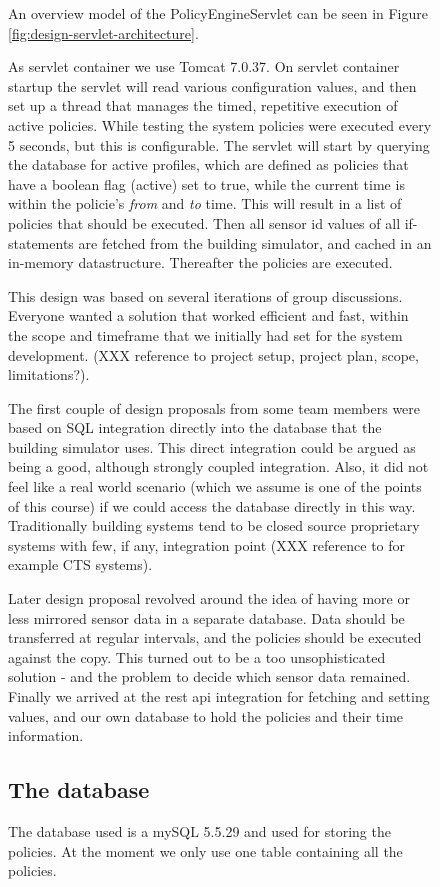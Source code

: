 \begin{figure}[t]
An overview model of the PolicyEngineServlet can be seen in Figure \ref{fig:design-servlet-architecture}.

As servlet container we use Tomcat 7.0.37. On servlet container startup the servlet will read various configuration values, and then set up a thread that manages the timed, repetitive execution of active policies. While testing the system policies were executed every 5 seconds, but this is configurable. The servlet will start by querying the database for active profiles, which are defined as policies that have a boolean flag (active) set to true, while the current time is within the policie's \textit{from} and \textit{to} time. This will result in a list of policies that should be executed. Then all sensor id values of all if-statements are fetched from the building simulator, and cached in an in-memory datastructure. Thereafter the policies are executed. 

This design was based on several iterations of group discussions. Everyone wanted a solution that worked efficient and fast, within the scope and timeframe that we initially had set for the system development. (XXX reference to project setup, project plan, scope, limitations?). 

The first couple of design proposals from some team members were based on SQL integration directly into the database that the building simulator uses. This direct integration could be argued as being a good, although strongly coupled integration. Also, it did not feel like a real world scenario (which we assume is one of the points of this course) if we could access the database directly in this way. Traditionally building systems tend to be closed source proprietary systems with few, if any, integration point (XXX reference to for example CTS systems).

Later design proposal revolved around the idea of having more or less mirrored sensor data in a separate database. Data should be transferred at regular intervals, and the policies should be executed against the copy. This turned out to be a too unsophisticated solution - and the problem to decide which sensor data remained. Finally we arrived at the rest api integration for fetching and setting values, and our own database to hold the policies and their time information.

\subsection{The database}
The database used is a mySQL 5.5.29 and used for storing the policies. At the moment we only use one table containing all the policies.


\end{figure}
